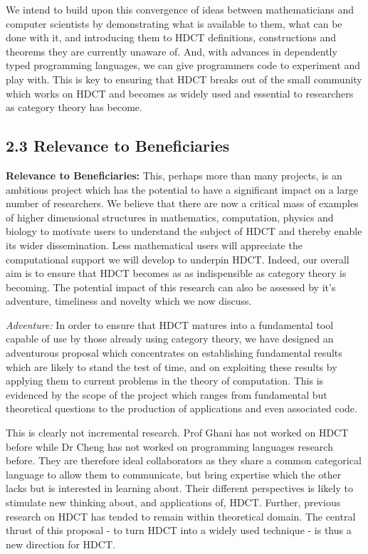 \documentclass[a4paper,10pt]{article}
\newcommand{\gap}{\protect{\hspace*{0.5em}}}
\begin{document}
We intend to build upon this convergence of ideas between
mathematicians and computer scientists by demonstrating what is
available to them, what can be done with it, and introducing them to
HDCT definitions, constructions and theorems they are currently
unaware of. And, with advances in dependently typed programming
languages, we can give programmers code to experiment and play
with. This is key to ensuring that HDCT breaks out of the small
community which works on HDCT and becomes as widely used and essential
to researchers as category theory has become.


\subsection*{2.3 \gap Relevance to Beneficiaries}

{\bf Relevance to Beneficiaries:} This, perhaps more than many
projects, is an ambitious project which has the potential to have a
significant impact on a large number of researchers. We believe that
there are now a critical mass of examples of higher dimensional
structures in mathematics, computation, physics and biology to
motivate users to understand the subject of HDCT and thereby enable
its wider dissemination. Less mathematical users will appreciate the
computational support we will develop to underpin HDCT. Indeed, our
overall aim is to ensure that HDCT becomes as as indispensible as
category theory is becoming. The potential impact of this research can
also be assessed by it's adventure, timeliness and novelty which we
now discuss.

{\em Adventure:} In order to ensure that HDCT matures into a
fundamental tool capable of use by those already using category
theory, we have designed an adventurous proposal which concentrates on
establishing fundamental results which are likely to stand the test of
time, and on exploiting these results by applying them to current
problems in the theory of computation. This is evidenced by the scope
of the project which ranges from fundamental but theoretical questions
to the production of applications and even associated code.

This is clearly not incremental research. Prof Ghani has not worked on
HDCT before while Dr Cheng has not worked on programming languages
research before. They are therefore ideal collaborators as they share
a common categorical language to allow them to communicate, but bring
expertise which the other lacks but is interested in learning about.
Their different perspectives is likely to stimulate new thinking
about, and applications of, HDCT. Further, previous research on HDCT
has tended to remain within theoretical domain. The central thrust of
this proposal - to turn HDCT into a widely used technique - is thus a
new direction for HDCT.
\end{document}
